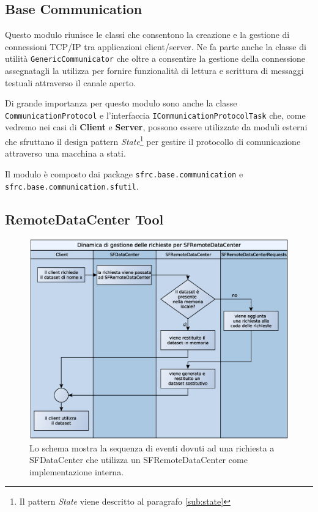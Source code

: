 
\subsection{Base Communication}
\label{sub:basecommodule}
Questo modulo riunisce le classi che consentono la creazione e la gestione di connessioni TCP/IP tra applicazioni client/server. Ne fa parte anche la classe di utilit\`a \texttt{GenericCommunicator} che oltre a consentire la gestione della connessione assegnatagli la utilizza per fornire funzionalit\`a di lettura e scrittura di messaggi testuali attraverso il canale aperto.

Di grande importanza per questo modulo sono anche la classe \texttt{CommunicationProtocol} e l'interfaccia \texttt{ICommunicationProtocolTask} che, come vedremo nei casi di \textbf{Client} e \textbf{Server}, possono essere utilizzate da moduli esterni che sfruttano il design pattern \textit{State}\footnote{Il pattern \textit{State} viene descritto al paragrafo \ref{sub:state}} per gestire il protocollo di comunicazione attraverso una macchina a stati.

Il modulo \`e composto dai package \texttt{sfrc.base.communication} e \\\texttt{sfrc.base.communication.sfutil}.

\subsection{RemoteDataCenter Tool}
\label{sub:remotedatacentertoolmodule}

\begin{figure}[t]
\begin{center}
\includegraphics[width=\textwidth]{Immagini/DinamicaSFRemoteDataCenter}
\caption[Sequenza di eventi di una richiesta a SFRemoteDataCenter.]{Lo schema mostra la sequenza di eventi dovuti ad una richiesta a SFDataCenter che utilizza un SFRemoteDataCenter come implementazione interna.\label{f:dinamicasfremotedatacenter}} 
\end{center} 
\end{figure}

